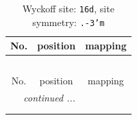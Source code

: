 \documentclass[fleqn,8pt]{jsarticle}
\begin{document}
\renewcommand{\arraystretch}{1.2}
\begin{longtable}{ccc}
\caption{Wyckoff site: {\tt 16d}, site symmetry: {\tt .-3'm}}
 \\
 \hline \hline
No. & position & mapping \\ \hline \endfirsthead

\multicolumn{2}{l}{\tablename\ \thetable{}} \\
 \hline \hline
No. & position & mapping \\ \hline \endhead

 \hline \hline
\multicolumn{2}{r}{\footnotesize\it continued ...} \\ \endfoot

 \hline \hline
\multicolumn{2}{r}{} \\ \endlastfoot


\end{longtable}
\end{document}
